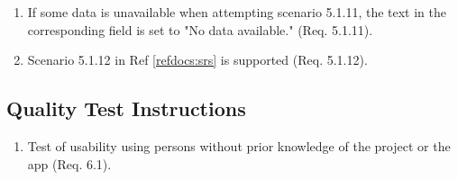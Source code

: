 \documentclass[a4paper]{article}
\newlength{\testlabellength}
\newenvironment{testlist}{\begin{enumerate}[label=\bfseries Instruction \thesubsection.\arabic* , labelindent=0pt, labelwidth=\testlabellength , leftmargin=2cm]}{\end{enumerate}}
\newenvironment{precondition}{
{\color{white}BLARG}\\ 
\textbf{Precondition}
\begin{itemize}[labelindent=0cm, labelwidth=2cm , leftmargin=1cm]
}
{\end{itemize}}
\newenvironment{instruction}{
\textbf{Instructions:}
\begin{enumerate}[label=\bfseries  \arabic*., labelindent=0cm, labelwidth=2cm , leftmargin=1cm]
}
{\end{enumerate}}
\newenvironment{postcondition}{
\textbf{Postcondition:}
\begin{itemize}[labelindent=0cm, labelwidth=2cm , leftmargin=1cm]
}
{\end{itemize}}
\begin{document}
\begin{appendices}
\begin{testlist}
	\item If some data is unavailable when attempting scenario 5.1.11, the text in the corresponding field is set to "No data available." (Req. 5.1.11).

	\item Scenario 5.1.12 in Ref \ref{refdocs:srs} is supported (Req. 5.1.12).
\end{testlist}

\subsection{Quality Test Instructions}

\begin{testlist}

	\item Test of usability using persons without prior knowledge of the project or the app (Req. 6.1).


\end{testlist}
\end{appendices}
\end{document}
